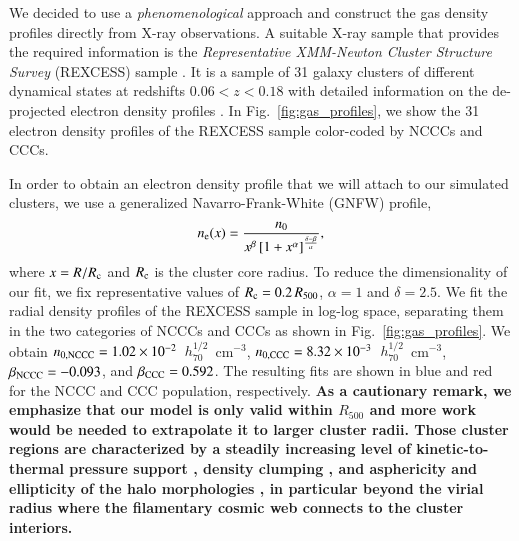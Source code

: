 \documentclass[useAMS,usenatbib]{mn2e}
\begin{document}
We decided to use a \emph{phenomenological} approach and construct the gas
density profiles directly from X-ray observations. A suitable X-ray sample that
provides the required information is the \emph{Representative XMM-Newton Cluster
  Structure Survey} (REXCESS) sample \citep{2008A&A...487..431C,
  2009A&A...498..361P}. It is a sample of 31 galaxy clusters of different
dynamical states at redshifts $0.06<z<0.18$ with detailed information on the
de-projected electron density profiles \citep{2008A&A...487..431C}. In
Fig.~\ref{fig:gas_profiles}, we show the 31 electron density profiles of the
REXCESS sample color-coded by NCCCs and CCCs.

In order to obtain an electron density profile that we will attach to our
simulated clusters, we use a generalized Navarro-Frank-White (GNFW) profile,
\begin{equation}
n_{{\mathrm{e}}}(x) = \frac{n_{0}}{x^{\beta}\left[1+x^{\alpha}\right]^{\frac{\delta-\beta}{\alpha}}},
\label{eq:gnfw}
\end{equation}
where $x=R/R_{{\mathrm{c}}}$ and $R_{{\mathrm{c}}}$ is the cluster core radius. To reduce
the dimensionality of our fit, we fix representative values of $R_{{\mathrm{c}}} =
0.2\, R_{500}$, $\alpha = 1$ and $\delta = 2.5$. We fit the radial density
profiles of the REXCESS sample in log-log space, separating them in the two
categories of NCCCs and CCCs as shown in Fig.~\ref{fig:gas_profiles}.  We obtain
$n_{{\mathrm{0,NCCC}}} = 1.02\times10^{-2}$~$h_{70}^{1/2}$~cm$^{-3}$,
$n_{{\mathrm{0,CCC}}} = 8.32\times10^{-3}$~$h_{70}^{1/2}$~cm$^{-3}$,
$\beta_{{\mathrm{NCCC}}} = -0.093$, and $\beta_{{\mathrm{CCC}}} = 0.592$. The resulting
fits are shown in blue and red for the NCCC and CCC population,
respectively. {\bf As a cautionary remark, we emphasize that our model is only
  valid within $R_{500}$ and more work would be needed to extrapolate it to
  larger cluster radii. Those cluster regions are characterized by a steadily
  increasing level of kinetic-to-thermal pressure support
  \citep[e.g.,][]{2009ApJ...705.1129L, 2012ApJ...758...74B}, density clumping
  \citep{2011ApJ...731L..10N, 2012arXiv1209.4082B}, and asphericity and
  ellipticity of the halo morphologies \citep{2012arXiv1209.4082B}, in
  particular beyond the virial radius where the filamentary cosmic web connects
  to the cluster interiors.}
\end{document}
